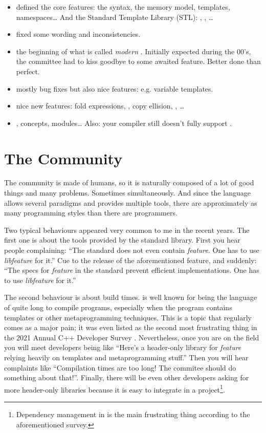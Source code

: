 \begin{itemize}
\item {\bf {}} defined the core features: the syntax, the memory
  model, templates, namespaces… And the Standard Template Library
  (STL): , , …
\item {\bf {}} fixed some wording and inconsistencies.
\item {\bf {}} the beginning of what is called \emph{modern
  \cpp}. Initially expected during the 00's, the committee had to kiss
  goodbye to some awaited feature. Better done than perfect.
\item {\bf {}} mostly bug fixes but also nice features:
  e.g. variable templates.
\item {\bf {}} nice new features: fold expressions, , copy ellision, , …
\item {\bf {}} , concepts, modules… Also: your
  compiler still doesn't fully support .
\end{itemize}

\section{The Community}

The \cpp{} community is made of humans, so it is naturally composed of
a lot of good things and many problems. Sometimes simultaneously. And
since the language allows several paradigms and provides multiple
tools, there are approximately as many programming styles than there
are \cpp{} programmers.

Two typical behaviours appeared very common to me in the recent
years. The first one is about the tools provided by the standard
library. First you hear people complaining: ``The standard does not
even contain {\em feature}. One has to use {\em libfeature} for it.''
Cue to the release of the aforementioned feature, and suddenly: ``The
specs for {\em feature} in the standard prevent efficient
implementations. One has to use {\em libfeature} for it.''

The second behaviour is about build times. \Cpp{} is well known for
being the language of quite long to compile programs, especially when
the program contains templates or other metaprogramming
techniques. This is a topic that regularly comes as a major pain; it
was even listed as the second most frustrating thing in the 2021
Annual C++ Developer Survey
\cite{2021-annual-cpp-developer-survey}. Nevertheless, once you are on
the field you will meet developers being like ``Here's a header-only
library for {\em feature} relying heavily on templates and
metaprogramming stuff.'' Then you will hear complaints like
``Compilation times are too long!  The commitee should do something
about that!''. Finally, there will be even other developers asking for
more header-only libraries because it is easy to integrate in a
project\footnote{Dependency management in \cpp{} is the main
  frustrating thing according to the aforementioned survey.}.

